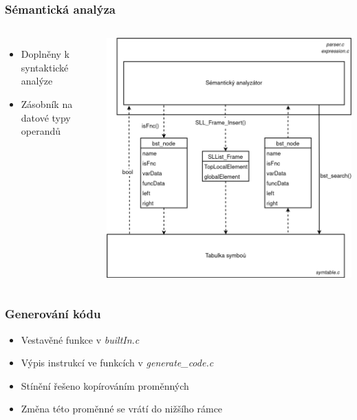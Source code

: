 \begin{frame}\frametitle{Sémantická analýza}
    \begin{columns}
        \begin{itemize}
        \setlength\itemsep{1em}
            \item Doplněny k syntaktické analýze
            \item Zásobník na datové typy operandů
        \end{itemize}

        \centering
        \includegraphics[scale=0.25,keepaspectratio]{img/DiagramSem.png}
    \end{columns}
\end{frame}



\begin{frame}
  \frametitle{Generování kódu}
  \begin{itemize}
        \setlength\itemsep{1em}
            \item Vestavěné funkce v \emph{builtIn.c}
            \item Výpis instrukcí ve funkcích v \emph{generate\_code.c}
            \item Stínění řešeno kopírováním proměnných
            \item Změna této proměnné se vrátí do nižšího rámce
        \end{itemize}
\end{frame}



